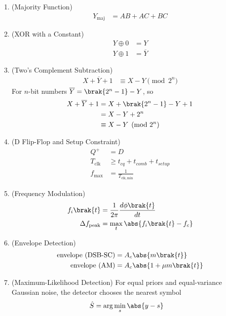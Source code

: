 \begin{enumerate}[label=\thesubsection.\arabic*, ref=\thesubsection.\theenumi, itemsep=0pt, leftmargin=0pt, labelwidth=0pt, itemindent=0pt, labelsep=1em, align=right]
\item (Majority Function)
\begin{align}
Y_{\mathrm{maj}} &= AB + AC + BC
\label{eq:F-maj}
\end{align}

\item (XOR with a Constant)
\begin{align}
Y \oplus 0 &= Y
\\
Y \oplus 1 &= \overline{Y}
\label{eq:F-xor}
\end{align}

\item (Two's Complement Subtraction)
\begin{align}
X + \overline{Y} + 1 &\equiv X - Y \pmod{2^n}
\label{eq:F-twos}
\end{align}
\solution For $n$-bit numbers $\overline{Y} = \brak{2^n - 1} - Y$, so
\begin{align}
X + \overline{Y} + 1 &= X + \brak{2^n - 1} - Y + 1
\\
&= X - Y + 2^n
\\
&\equiv X - Y \pmod{2^n}
\end{align}

\item (D Flip-Flop and Setup Constraint)
\begin{align}
Q^{+} &= D
\label{eq:F-dff}
\\
T_{\mathrm{clk}} &\ge t_{cq} + t_{comb} + t_{setup}
\\
f_{\max} &= \frac{1}{T_{\mathrm{clk,min}}}
\label{eq:F-setup}
\end{align}

\item (Frequency Modulation)
\begin{align}
f_i\brak{t} &= \frac{1}{2\pi} \frac{d\phi\brak{t}}{dt}
\\
\Delta f_{\mathrm{peak}} &= \max_{t} \abs{f_i\brak{t} - f_c}
\label{eq:F-fm}
\end{align}

\item (Envelope Detection)
\begin{align}
\text{envelope (DSB-SC)} &= A_c \abs{m\brak{t}}
\\
\text{envelope (AM)} &= A_c \abs{1 + \mu m\brak{t}}
\label{eq:F-envelope}
\end{align}

\item (Maximum-Likelihood Detection) For equal priors and equal-variance Gaussian noise, the detector chooses the nearest symbol
\begin{align}
\hat{S} &= \arg\min_{s} \abs{y - s}
\label{eq:F-ml}
\end{align}


\end{enumerate}
